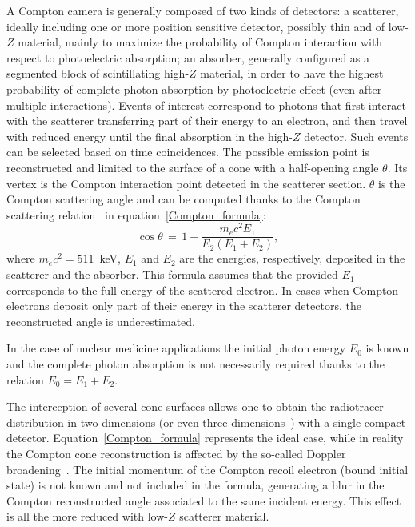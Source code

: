 A Compton camera is generally composed of two kinds of detectors: a scatterer, ideally including one or more position sensitive detector, possibly thin and of low-$Z$ material, mainly to maximize the probability of Compton interaction with respect to photoelectric absorption; an absorber, generally configured as a segmented block of scintillating high-$Z$ material, in order to have the highest probability of complete photon absorption by photoelectric effect (even after multiple interactions). Events of interest correspond to photons that first interact with the scatterer transferring part of their energy to an electron, and then travel with reduced energy until the final absorption in the high-$Z$ detector. Such events can be selected based on time coincidences. The possible emission point is reconstructed and limited to the surface of a cone  with a half-opening angle \(\theta\). Its vertex is the Compton interaction point detected in the scatterer section. \(\theta\) is the Compton scattering angle and can be computed thanks to the Compton scattering relation~\cite{Compton1923} in equation~\ref{Compton_formula}:\\
\begin{equation}
\cos\theta\,=\,1-\frac{m_{e}c^{2}E_{1}}{E_{2}(E_{1}+E_{2})},
\label{Compton_formula}
\end{equation} 
where \(m_{e}c^{2} = 511\)~keV, \(E_{1}\) and \(E_{2}\) are the energies, respectively, deposited in the scatterer and the absorber. This formula assumes that the provided \(E_{1}\) corresponds to the full energy of the scattered electron. In cases when Compton electrons deposit only part of their energy in the scatterer detectors, the reconstructed angle is underestimated.

In the case of nuclear medicine applications the initial photon energy \(E_{0}\) is known and the complete photon absorption is not necessarily required thanks to the relation \(E_{0} = E_{1}+E_{2}\). 

The interception of several cone surfaces allows one to obtain the radiotracer distribution in two dimensions (or even three dimensions~\cite{McKisson3D}) with a single compact detector. Equation~\ref{Compton_formula} represents the ideal case, while in reality the Compton cone reconstruction is affected by the so-called Doppler broadening~\cite{Doppler}. The initial momentum of the Compton recoil electron (bound initial state) is not known and not included in the formula, generating a blur in the Compton reconstructed angle associated to the same incident energy. This effect is all the more reduced with low-$Z$ scatterer material.

